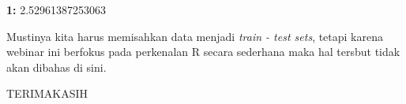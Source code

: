 \documentclass[11pt]{article}
\begin{document}
    \textbf{1:} 2.52961387253063

    
    Mustinya kita harus memisahkan data menjadi \emph{train - test sets},
tetapi karena webinar ini berfokus pada perkenalan R secara sederhana
maka hal tersbut tidak akan dibahas di sini.

    TERIMAKASIH


    
    
    
\end{document}
